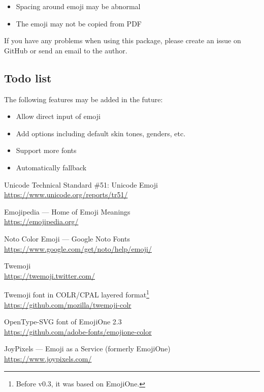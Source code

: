 \documentclass{l3doc}
\newcounter { emoji }
\begin{document}
\begin{itemize}
  \item Spacing around emoji may be abnormal
  \item The emoji may not be copied from PDF
\end{itemize}

If you have any problems when using this package, please create an issue on GitHub or send
an email to the author.

\subsection{ Todo list}

The following features may be added in the future:

\begin{itemize}
  \item Allow direct input of emoji
  \item Add options including default skin tones, genders, etc.
  \item Support more fonts
  \item Automatically fallback
\end{itemize}

\begin{thebibliography}{9}
  \def\newblock{\\}
  \small

  Unicode\textregistered{} Technical Standard \#51: Unicode Emoji
  \newblock \url{https://www.unicode.org/reports/tr51/}

   Emojipedia ---  Home of Emoji Meanings
  \newblock \url{https://emojipedia.org/}

  Noto Color Emoji --- Google Noto Fonts
  \newblock \url{https://www.google.com/get/noto/help/emoji/}

  Twemoji
  \newblock \url{https://twemoji.twitter.com/}

  Twemoji font in COLR/CPAL layered format\footnote{Before v0.3, it was based on EmojiOne.}
  \newblock \url{https://github.com/mozilla/twemoji-colr}

  OpenType-SVG font of EmojiOne 2.3
  \newblock \url{https://github.com/adobe-fonts/emojione-color}

  JoyPixels\texttrademark{} --- Emoji as a Service (formerly EmojiOne)
  \newblock \url{https://www.joypixels.com/}
\end{thebibliography}
\end{document}
